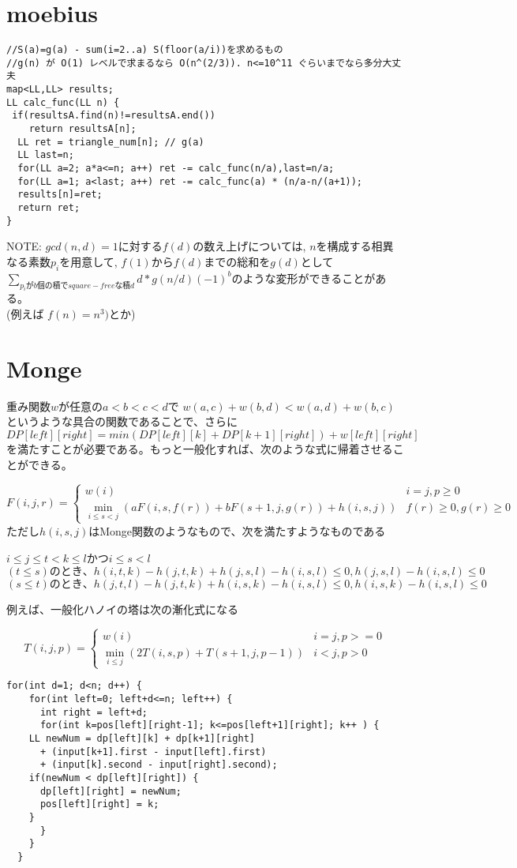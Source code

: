 \section{moebius}

\begin{lstlisting}[caption = gcd系関数]
//S(a)=g(a) - sum(i=2..a) S(floor(a/i))を求めるもの
//g(n) が O(1) レベルで求まるなら O(n^(2/3)). n<=10^11 ぐらいまでなら多分大丈夫 
map<LL,LL> results;
LL calc_func(LL n) {
 if(resultsA.find(n)!=resultsA.end())
    return resultsA[n];
  LL ret = triangle_num[n]; // g(a)
  LL last=n;
  for(LL a=2; a*a<=n; a++) ret -= calc_func(n/a),last=n/a;
  for(LL a=1; a<last; a++) ret -= calc_func(a) * (n/a-n/(a+1));
  results[n]=ret;
  return ret;
}
\end{lstlisting}

NOTE: $gcd(n,d)=1$に対する$f(d)$の数え上げについては, $n$を構成する相異なる素数$p_i$を用意して, $f(1)$から$f(d)$までの総和を$g(d)$として\\
$\sum_{p_iがb個の積でsquare-freeな積d}{ d*g(n/d)(-1)^b }$のような変形ができることがある。\\
(例えば $f(n) = n^3)$とか)

\section{Monge}
重み関数$w$が任意の$a<b<c<d$で $w(a,c)+w(b,d)<w(a,d)+w(b,c)$というような具合の関数であることで、さらに$DP[left][right] = min(DP[left][k] + DP[k+1][right])+w[left][right]$を満たすことが必要である。もっと一般化すれば、次のような式に帰着させることができる。

\[
F(i,j,r) = \begin{cases}
  w(i) & i=j , p \geq 0 \\
  \min_{i \leq s <j} ( aF(i,s,f(r)) + bF(s+1,j,g(r)) +h(i,s,j) ) & f(r) \geq 0 , g(r) \geq 0
\end{cases} \]
 ただし$h(i,s,j)$はMonge関数のようなもので、次を満たすようなものである

$i \leq j \leq t < k \leq l$かつ$i \leq s < l$
\[
(t\leq s)のとき、 h(i,t,k) - h(j,t,k) + h(j,s,l) - h(i,s,l) \leq 0 , h(j,s,l) - h(i,s,l) \leq 0 \]
\[
(s \leq t)のとき、h(j,t,l) - h(j,t,k) + h(i,s,k) - h(i,s,l) \leq 0, h(i,s,k) - h(i,s,l) \leq 0 \]



例えば、一般化ハノイの塔は次の漸化式になる

\[
T(i,j,p) = \begin{cases}
w(i) & i=j , p>=0  \\
\min_{i \leq j}(2T(i,s,p) + T(s+1,j,p-1)) & i<j, p>0

\end{cases} \]
\begin{lstlisting}[caption=MongeDP]
  for(int d=1; d<n; d++) {
    for(int left=0; left+d<=n; left++) {
      int right = left+d;
      for(int k=pos[left][right-1]; k<=pos[left+1][right]; k++ ) {
	LL newNum = dp[left][k] + dp[k+1][right]
	  + (input[k+1].first - input[left].first)
	  + (input[k].second - input[right].second);
	if(newNum < dp[left][right]) {
	  dp[left][right] = newNum;
	  pos[left][right] = k;	  
	}
      }
    }
  } 
\end{lstlisting}



